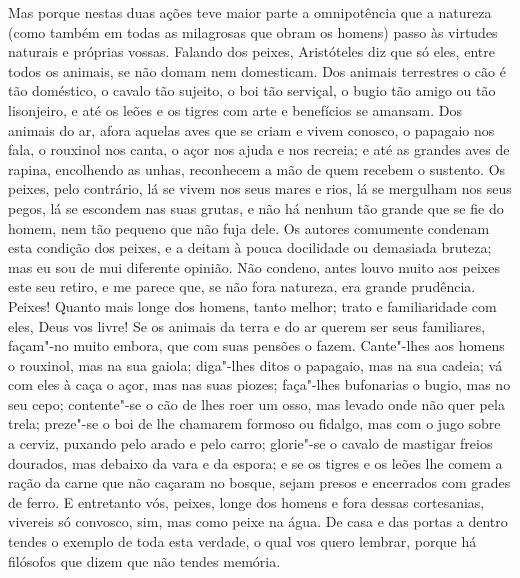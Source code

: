 Mas porque nestas duas ações teve maior parte a omnipotência que a
natureza (como também em todas as milagrosas que obram os homens) passo
às virtudes naturais e próprias vossas. Falando dos peixes, Aristóteles diz
que só eles, entre todos os animais, se não domam nem domesticam. Dos
animais terrestres o cão é tão doméstico, o cavalo tão sujeito, o boi
tão serviçal, o bugio tão amigo ou tão lisonjeiro, e até os leões e os
tigres com arte e benefícios se amansam. Dos animais do ar, afora
aquelas aves que se criam e vivem conosco, o papagaio nos fala, o
rouxinol nos canta, o açor nos ajuda e nos recreia; e até as grandes
aves de rapina, encolhendo as unhas, reconhecem a mão de quem recebem o
sustento. Os peixes, pelo contrário, lá se vivem nos seus mares e rios,
lá se mergulham nos seus pegos, lá se escondem nas suas grutas, e não há
nenhum tão grande que se fie do homem, nem tão pequeno que não fuja
dele. Os autores comumente condenam esta condição dos peixes, e a deitam
à pouca docilidade ou demasiada bruteza; mas eu sou de mui diferente
opinião. Não condeno, antes louvo muito aos peixes este seu retiro, e me
parece que, se não fora natureza, era grande prudência. Peixes! Quanto
mais longe dos homens, tanto melhor; trato e familiaridade com eles,
Deus vos livre! Se os animais da terra e do ar querem ser seus
familiares, façam"-no muito embora, que com suas pensões o fazem.
Cante"-lhes aos homens o rouxinol, mas na sua gaiola; diga"-lhes ditos o
papagaio, mas na sua cadeia; vá com eles à caça o açor, mas nas suas
piozes; faça"-lhes bufonarias o bugio, mas no seu cepo; contente"-se o cão
de lhes roer um osso, mas levado onde não quer pela trela; preze"-se o
boi de lhe chamarem formoso ou fidalgo, mas com o jugo sobre a cerviz,
puxando pelo arado e pelo carro; glorie"-se o cavalo de mastigar freios
dourados, mas debaixo da vara e da espora; e se os tigres e os leões lhe
comem a ração da carne que não caçaram no bosque, sejam presos e
encerrados com grades de ferro. E entretanto vós, peixes, longe dos
homens e fora dessas cortesanias, vivereis só convosco, sim, mas como
peixe na água. De casa e das portas a dentro tendes o exemplo de toda
esta verdade, o qual vos quero lembrar, porque há filósofos que dizem
que não tendes memória.

